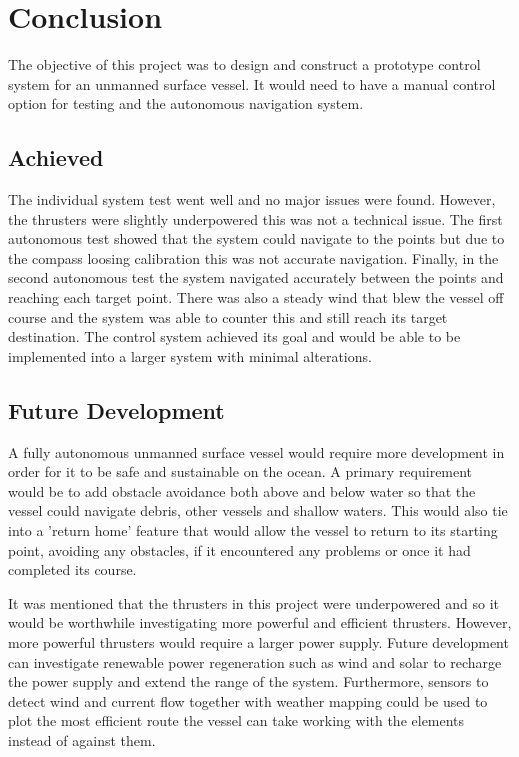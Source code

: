 \chapter{Conclusion}
The objective of this project was to design and construct a prototype control system for an unmanned surface vessel. It would need to have a manual control option for testing and the autonomous navigation system.
\section{Achieved}
The individual system test went well and no major issues were found. However, the thrusters were slightly underpowered this was not a technical issue. The first autonomous test showed that the system could navigate to the points but due to the compass loosing calibration this was not accurate navigation. Finally, in the second autonomous test the system navigated accurately between the points and reaching each target point. There was also a steady wind that blew the vessel off course and the system was able to counter this and still reach its target destination. The control system achieved its goal and would be able to be implemented into a larger system with minimal alterations. 
\section{Future Development}
A fully autonomous unmanned surface vessel would require more development in order for it to be safe and sustainable on the ocean. A primary requirement would be to add obstacle avoidance both above and below water so that the vessel could navigate debris, other vessels and shallow waters. This would also tie into a 'return home' feature that would allow the vessel to return to its starting point, avoiding any obstacles, if it encountered any problems or once it had completed its course. \par
It was mentioned that the thrusters in this project were underpowered and so it would be worthwhile investigating more powerful and efficient thrusters. However, more powerful thrusters would require a larger power supply. Future development can investigate renewable power regeneration such as wind and solar to recharge the power supply and extend the range of the system. Furthermore, sensors to detect wind and current flow together with weather mapping could be used to plot the most efficient route the vessel can take working with the elements instead of against them. 